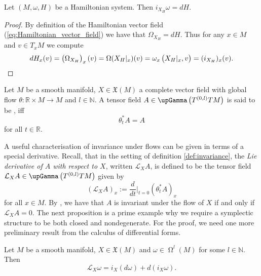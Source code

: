 \begin{lemma}
	\label{lem:interior_multiplication_Hamiltonian_vector_field}
	Let $(M,\omega,H)$ be a Hamiltonian system. Then $i_{X_H}\omega = dH$.
\end{lemma}

\begin{proof}
	By definition of the Hamiltonian vector field (\ref{eq:Hamiltonian_vector_field}) we have that $\Omega_{X_H} = dH$. Thus for any $x \in M$ and $v \in T_xM$ we compute
	\begin{equation*}
		dH_x(v) = \del[1]{\Omega_{X_H}}_x(v) = \Omega(X_H\vert_x)(v) = \omega_x\del[1]{X_H\vert_x,v} = (i_{X_H})_x(v). 
	\end{equation*}
\end{proof}

\begin{definition}[Invariance]
	\label{def:invariance}
	Let $M$ be a smooth manifold, $X \in \mathfrak{X}(M)$ a complete vector field with global flow $\theta : \mathbb{R} \times M \to M$ and $l \in \mathbb{N}$. A tensor field $A \in \upGamma\del[1]{T^{(0,l)}TM}$ is said to be , iff
	\begin{equation*}
		\theta_t^*A = A
	\end{equation*}
	\noindent for all $t \in \mathbb{R}$.
\end{definition}

A useful characterisation of invariance under flows can be given in terms of a special derivative. Recall, that in the setting of definition \ref{def:invariance}, the \emph{Lie derivative of $A$ with respect to $X$}, written $\mathcal{L}_XA$, is defined to be the tensor field $\mathcal{L}_XA \in \upGamma\del[1]{T^{(0,l)}TM}$ given by
\begin{equation*}
	(\mathcal{L}_XA)_x := \frac{d}{dt}\bigg\vert_{t = 0}(\theta^*_tA)_x
\end{equation*}
\noindent for all $x \in M$. By \cite[324]{lee:smooth_manifolds:2013}, we have that $A$ is invariant under the flow of $X$ if and only if $\mathcal{L}_XA = 0$. The next proposition is a prime example why we require a symplectic structure to be both closed and nondegenerate. For the proof, we need one more preliminary result from the calculus of differential forms.

\begin{proposition}
	\label{prop:Cartans_magic_formula}
	Let $M$ be a smooth manifold, $X \in \mathfrak{X}(M)$ and $\omega \in \upOmega^l(M)$ for some $l \in \mathbb{N}$. Then
	\begin{equation*}
		\mathcal{L}_X\omega = i_X(d\omega) + d(i_X\omega).
	\end{equation*}
\end{proposition}

